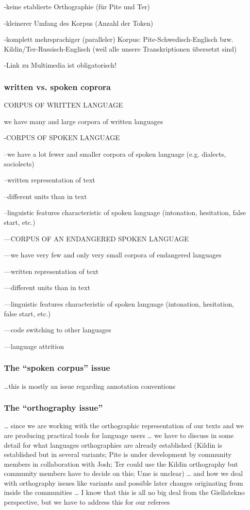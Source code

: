 \documentclass[a4paper,12pt]{article}
\begin{document}
-keine etablierte Orthographie (für Pite und Ter)

-kleinerer Umfang des Korpus (Anzahl der Token)

-komplett mehrsprachiger (paralleler) Korpus: Pite-Schwedisch-Englisch bzw. Kildin/Ter-Russisch-Englisch (weil alle unsere Transkriptionen übersetzt sind)

-Link zu Multimedia ist obligatorisch!


\subsubsection{written vs. spoken coprora} 
CORPUS OF WRITTEN LANGUAGE

we have many and large corpora of written languages

-CORPUS OF SPOKEN LANGUAGE

--we have a lot fewer and smaller corpora of spoken language (e.g. dialects, sociolects)

--written representation of text

--different units than in text

--linguistic features characteristic of spoken language (intonation, hesitation, false start, etc.)

---CORPUS OF AN ENDANGERED SPOKEN LANGUAGE

---we have very few and only very small corpora of endangered languages

---written representation of text

---different units than in text

---linguistic features characteristic of spoken language (intonation, hesitation, false start, etc.)

---code switching to other languages

---language attrition

\subsubsection{The “spoken corpus” issue}
…this is mostly an issue regarding annotation conventions

\subsubsection{The “orthography issue”}
… since we are working with the orthographic representation of our texts and we are producing practical tools for language users … we have to discuss in some detail for what languages orthographies are already established (Kildin is established but in several variants; Pite is under development by community members in collaboration with Josh; Ter could use the Kildin orthography but community members have to decide on this; Ume is unclear) … and how we deal with orthography issues like variants and possible later changes originating from inside the communities … I know that this is all no big deal from the Giellatekno perspective, but we have to address this for our referees 
\end{document}
